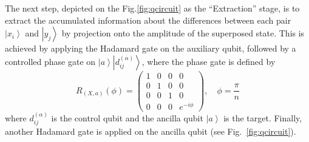 \documentclass[pra,showkeys,twocolumn,showpacs]{revtex4-1}
\begin{document}
The next step, depicted on the Fig.\ref{fig:qcircuit} as the ``Extraction'' stage, is to extract the accumulated information about the differences between each pair $\left| x_i \right\rangle$ and $\left| y_j \right\rangle$ by projection onto the amplitude of the superposed state. This is achieved by applying the Hadamard gate on the auxiliary qubit, followed by a controlled phase gate on $\left|a\right\rangle \left|d_{ij}^{(\alpha)}\right\rangle$, where the phase gate is defined by
\begin{equation}
    \label{eq:controled_phase_rotation}
    R_{(X,a)}(\phi) =
    \begin{pmatrix}
        1 & 0 & 0 & 0 \\
        0 & 1 & 0 & 0 \\
        0 & 0 & 1 & 0 \\
        0 & 0 & 0 & e^{-i\phi}
    \end{pmatrix} ,
    \quad \phi = \frac{\pi}{n}
\end{equation}
%
where $d_{ij}^{(\alpha)}$ is the control qubit and the ancilla qubit $\left| a \right\rangle$ is the target. Finally, another Hadamard gate is applied on the ancilla qubit (see Fig.~\ref{fig:qcircuit}).
\end{document}

